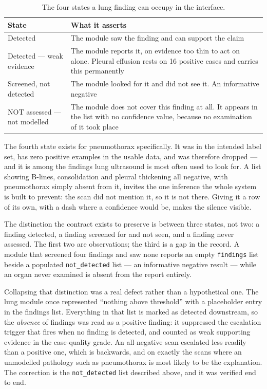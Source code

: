 \begin{table}[H]
  \centering
  \small
  \begin{tabularx}{\linewidth}{lX}
    \toprule
    \textbf{State} & \textbf{What it asserts} \\
    \midrule
    Detected & The module saw the finding and can support the claim \\
    \addlinespace[2pt]
    Detected --- weak evidence & The module reports it, on evidence too thin to act on alone.
      Pleural effusion rests on 16 positive cases and carries this permanently \\
    \addlinespace[2pt]
    Screened, not detected & The module looked for it and did not see it. An informative
      negative \\
    \addlinespace[2pt]
    NOT assessed --- not modelled & The module does not cover this finding at all. It appears
      in the list with no confidence value, because no examination of it took place \\
    \bottomrule
  \end{tabularx}
  \caption{The four states a lung finding can occupy in the interface.}
  \label{tab:four-states}
\end{table}

The fourth state exists for pneumothorax specifically. It was in the intended label set, has
zero positive examples in the usable data, and was therefore dropped --- and it is among the
findings lung ultrasound is most often used to look for. A list showing B-lines, consolidation
and pleural thickening all negative, with pneumothorax simply absent from it, invites the one
inference the whole system is built to prevent: the scan did not mention it, so it is not
there. Giving it a row of its own, with a dash where a confidence would be, makes the silence
visible.

The distinction the contract exists to preserve is between three states, not two: a finding
detected, a finding screened for and not seen, and a finding never assessed. The first two are
observations; the third is a gap in the record. A module that screened four findings and saw
none reports an empty \texttt{findings} list beside a populated \texttt{not\_detected} list ---
an informative negative result --- while an organ never examined is absent from the report
entirely.

Collapsing that distinction was a real defect rather than a hypothetical one. The lung module
once represented ``nothing above threshold'' with a placeholder entry in the findings list.
Everything in that list is marked as detected downstream, so the \emph{absence} of findings was
read as a positive finding: it suppressed the escalation trigger that fires when no finding is
detected, and counted as weak supporting evidence in the case-quality grade. An all-negative
scan escalated less readily than a positive one, which is backwards, and on exactly the scans
where an unmodelled pathology such as pneumothorax is most likely to be the explanation. The
correction is the \texttt{not\_detected} list described above, and it was verified end to end.
